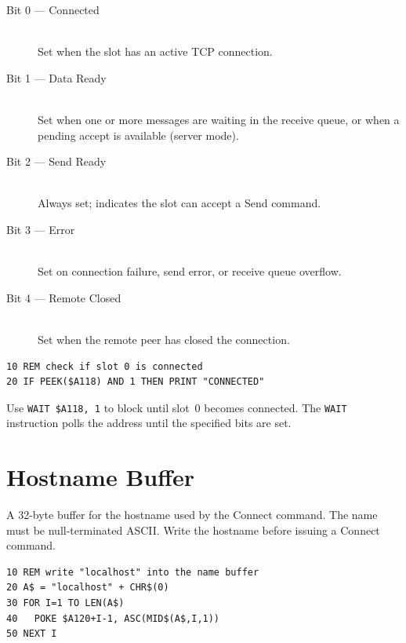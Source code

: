 \begin{description}
  \item[Bit 0 --- Connected]\hfill\\
    Set when the slot has an active TCP connection.
  \item[Bit 1 --- Data Ready]\hfill\\
    Set when one or more messages are waiting in the receive queue, or when
    a pending accept is available (server mode).
  \item[Bit 2 --- Send Ready]\hfill\\
    Always set; indicates the slot can accept a Send command.
  \item[Bit 3 --- Error]\hfill\\
    Set on connection failure, send error, or receive queue overflow.
  \item[Bit 4 --- Remote Closed]\hfill\\
    Set when the remote peer has closed the connection.
\end{description}

\begin{lstlisting}
10 REM check if slot 0 is connected
20 IF PEEK($A118) AND 1 THEN PRINT "CONNECTED"
\end{lstlisting}

\begin{notebox}
Use \texttt{WAIT \$A118, 1} to block until slot~0 becomes connected.  The
\texttt{WAIT} instruction polls the address until the specified bits are set.
\end{notebox}


\section{Hostname Buffer}
\label{sec:nic-hostname}



A 32-byte buffer for the hostname used by the Connect command.  The name must
be null-terminated ASCII.  Write the hostname before issuing a Connect command.

\begin{lstlisting}
10 REM write "localhost" into the name buffer
20 A$ = "localhost" + CHR$(0)
30 FOR I=1 TO LEN(A$)
40   POKE $A120+I-1, ASC(MID$(A$,I,1))
50 NEXT I
\end{lstlisting}


